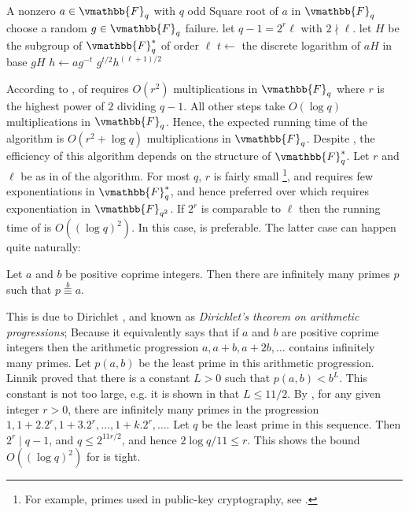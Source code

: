 \begin{algorithm}
\label{algorithm:Tonelli-sq}
\begin{algorithmic}[1]
\REQUIRE A nonzero $a \in \vmathbb{F}_q$ with $q$ odd
\ENSURE Square root of $a$ in $\vmathbb{F}_{q}$
\STATE choose a random $g \in \vmathbb{F}_q$
	\RETURN failure.
\ENDIF
\STATE let $q - 1 = 2^r\ell$ with $2 \nmid \ell$.
\label{step:factor-q}
\STATE let $H$ be the subgroup of $\vmathbb{F}_q^*$ of order $\ell$
\STATE $t \leftarrow $ the discrete logarithm of $aH$ in base $gH$
\label{step:TS-DL}
\STATE $h \leftarrow ag^{-t}$
\RETURN $g^{t / 2}h^{(\ell + 1) / 2}$
\end{algorithmic}
\end{algorithm}

According to ,  of 
 requires $O(r^2)$ multiplications in $\vmathbb{F}_q$ where $r$ is 
the highest power of $2$ dividing $q - 1$. All other steps take $O(\log q)$ multiplications in 
$\vmathbb{F}_q$. Hence, the expected running time of the algorithm is $O(r^2 + \log q)$ 
multiplications in $\vmathbb{F}_q$. Despite  , the efficiency of 
this algorithm depends on the structure of $\vmathbb{F}_q^*$. Let $r$ and $\ell$ be as in 
 of the algorithm. For most $q$, $r$ is fairly small \footnote{For example, 
primes used in public-key cryptography, see \cite{Maurer1992a, Maurer1989}.}, and 
 requires few exponentiations in $\vmathbb{F}_q^*$, and hence 
preferred over  which requires exponentiation in 
$\vmathbb{F}_{q^2}$. If $2^r$ is comparable to $\ell$ then the running time of 
 is $O((\log q)^2)$. In this case,  
 is preferable. The latter case can happen quite naturally:
\begin{theorem}
\label{theorem:Dir-ar-prog}
Let $a$ and $b$ be positive coprime integers. Then there are infinitely many primes $p$ such that $p 
\overset{b}{\equiv} a$.
\end{theorem}

This is due to Dirichlet \cite{Dirichlet1837}, and known as \emph{Dirichlet's theorem on arithmetic 
progressions}; Because it equivalently says that if $a$ and $b$ are positive coprime integers then 
the arithmetic progression $a, a + b, a + 2b, \dots$ contains infinitely many primes. Let $p(a, b)$ 
be the least prime in this arithmetic progression. Linnik \cite{Linnik1944} proved that there is a 
constant $L > 0$ such that $p(a, b) < b^L$. This constant is not too large, e.g. it is shown in 
\cite{Heath-Brown1992} that $L \le 11/2$. By  , for any given 
integer $r > 0$, there are infinitely many primes in the progression $1, 1 + 2.2^r, 1 + 3.2^r, 
\dots, 1 + k.2^r, \dots$. Let $q$ be the least prime in this sequence. Then $2^r \mid q - 1$, and $q 
\le 2^{11r/2}$, and hence $2\log q / 11 \le r$. This shows the bound $O((\log q)^2)$ for 
 is tight.

